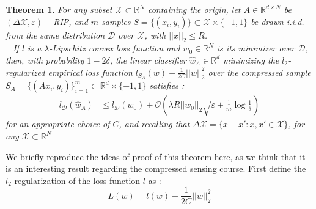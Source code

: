 \documentclass{article}
\newcommand{\R}{\mathbb R}
\newtheorem{theorem}{Theorem}[section]
\begin{document}
\begin{theorem}
    For any subset $\mathcal{X}\subset \R^N$ containing the origin, 
    let $A\in \R^{d\times N}$ be $(\Delta \mathcal{X}, \varepsilon)-$RIP, and $m$ 
    samples $S=\{ (x_i, y_i)\} \subset \mathcal{X}\times \{-1, 1\}$
    be drawn i.i.d. from the same distribution $\mathcal{D}$ over 
    $\mathcal{X}$, with $||x||_2 \leq R$. \\ 
    If $l$ is a $\lambda$-Lipschitz convex loss function and $w_0\in \R^N$
    is its minimizer over $\mathcal{D}$, then, with probability
    $1-2\delta$, the linear classifier $\hat{w}_A\in \R^d$ minimizing the 
    $l_2$-regularized empirical loss function $l_{S_A}(w)+\frac{1}{2C} ||w||_2^2$
    over the compressed sample $S_A = \{(Ax_i, y_i) \}_{i=1}^m
    \subset \R^d \times \{-1, 1\} $ satisfies :
    \begin{align}
        l_{\mathcal{D}}(\hat{w}_A) &\leq 
        l_{\mathcal{D}}(w_0) + \mathcal{O}
        \left ( 
            \lambda R ||w_0||_2 \sqrt{\varepsilon + \frac{1}{m}\log\frac{1}{\delta}}
        \right )
    \end{align}
    for an appropriate choice of $C$, and recalling that
     $\Delta \mathcal{X} = \{x-x' : x, x' \in \mathcal{X} \}$, for 
     any $\mathcal{X}\subset \R^N$
\end{theorem}
We briefly reproduce the ideas of proof of this theorem here, as we think that it is 
an interesting result regarding the compressed sensing course. 
    First define the $l_2$-regularization of the loss function $l$ as :
    \[L(w) = l(w) + \frac{1}{2C}||w||_2^2\]
\end{document}
